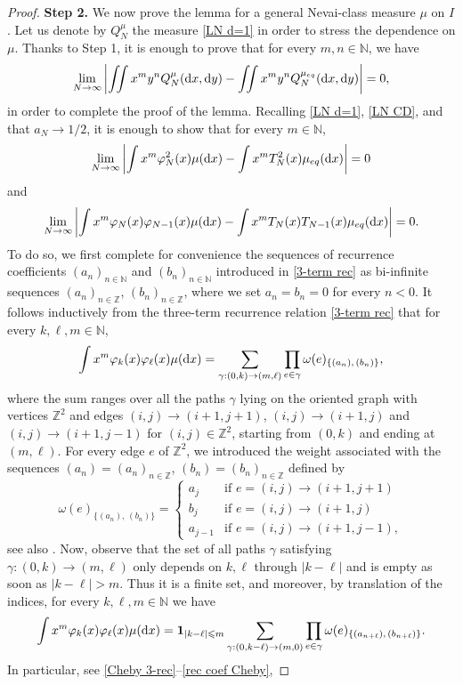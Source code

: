 \documentclass[a4paper,11pt]{article}
\numberwithin{equation}{section}
\theoremstyle{definition}
\newcommand{\eq}{\begin{equation}}
\newcommand{\qe}{\end{equation}}
\newcommand{\N}{\mathbb{N}}
\newcommand{\Z}{\mathbb{Z}}
\newcommand{\bv}{\mathbf}
\renewcommand{\leq}{\leqslant}
\renewcommand{\phi}{\varphi}
\renewcommand{\d}{ {\rm d}}
\begin{document}
\begin{proof}
\noindent \textbf{Step 2.}  We now prove the lemma for a general Nevai-class measure $\mu$ on $I$. Let us denote by $Q_N^\mu$ the measure \eqref{LN d=1} in order  to stress the dependence on $\mu$.  Thanks to Step 1, it is enough to prove that for every $m,n\in\N$, we have
\[
\lim_{N\to\infty}\left|\iint x^m y^n Q_N^\mu(\d x,\d y)-\iint x^m y^n Q_N^{\mu_{eq}}(\d x,\d y)\right|=0,
\]
in order to complete the proof of the lemma.  Recalling \eqref{LN d=1}, \eqref{LN CD}, and that  $a_N\to 1/2$, it is enough to show that for every $m\in\N$,
\eq
\label{moment 1}
\lim_{N\to\infty}\left|\int x^m \phi^2_N(x)\mu(\d x) -\int x^m T^2_N(x)\mu_{eq}(\d x)\right| =0
\qe
and
\eq
\label{moment 2}
\lim_{N\to\infty}\left|\int x^m \phi_N(x)\phi_{N-1}(x)\mu(\d x) -\int x^m T_N(x)T_{N-1}(x)\mu_{eq}(\d x)\right| =0.
\qe
To do so, we first complete for convenience the sequences of recurrence coefficients $(a_n)_{n\in\N}$ and $(b_n)_{n\in\N}$ introduced in \eqref{3-term rec} as bi-infinite sequences $(a_n)_{n\in\Z}$, $(b_n)_{n\in\Z}$, where we set $a_n=b_n=0$ for every $n<0$. It follows inductively from the three-term recurrence relation \eqref{3-term rec} that for every $k,\ell,m\in\N$,
\eq
\label{path rep}
\int x^m \phi_k(x)\phi_{\ell}(x)\mu(\d x)=\sum_{\gamma:(0,k)\rightarrow (m,\ell)} \prod_{e\in\gamma}\omega(e)_{\{(a_n),\,(b_n)\}},
\qe
where the sum ranges over all the paths $\gamma$ lying on the oriented graph with vertices $\Z^2$ and edges $(i,j)\to (i+1,j+1)$, $(i,j)\to (i+1,j)$ and $(i,j)\to (i+1,j-1)$ for $(i,j)\in\Z^2$, starting from $(0,k)$ and ending at $(m,\ell)$. For every edge $e$ of $\Z^2$, we introduced the weight associated with the sequences $(a_n)=(a_n)_{n\in\Z}$, $(b_n)=(b_n)_{n\in\Z}$ defined by
\eq
\label{weights paths}
\omega(e)_{\{(a_n),\,(b_n)\}}=
\begin{cases}
a_j & \mbox{if } e=(i,j)\to (i+1,j+1)\\
b_j & \mbox{if } e=(i,j)\to (i+1,j)\\
a_{j-1} & \mbox{if } e=(i,j)\to (i+1,j-1),
\end{cases}
\qe
see also \citep{Har15}. Now, observe that the set of all paths $\gamma$ satisfying $\gamma:(0,k)\rightarrow (m,\ell)$ only depends on $k,\ell$ through  $|k-\ell|$ and is empty as soon as $|k-\ell|>m$. Thus it is a finite set, and moreover, by translation of the indices, for every $k,\ell,m\in\N$ we have
\eq
\label{nice path}
\int x^m \phi_k(x)\phi_{\ell}(x)\mu(\d x)=\bv 1_{|k-\ell|\leq m} \sum_{\gamma:(0,k-\ell)\rightarrow (m,0)} \prod_{e\in\gamma}\omega(e)_{\{(a_{n+\ell}),\,(b_{n+\ell})\}}.
\qe
In particular, see  \eqref{Cheby 3-rec}--\eqref{rec coef Cheby},

\end{proof}
\end{document}
